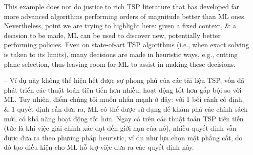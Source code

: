 \documentclass{article}
\begin{document}
\begin{itemize}
\begin{itemize}
\begin{itemize}
            This example does not do justice to rich TSP literature that has developed far more advanced algorithms performing orders of magnitude better than ML ones. Nevertheless, point we are trying to highlight here: given a fixed context, \& a decision to be made, ML can be used to discover new, potentially better performing policies. Even on state-of-art TSP algorithms (i.e., when exact solving is taken to its limits), many decisions are made in heuristic ways, e.g., cutting plane selection, thus leaving room for ML to assist in making these decisions.

            -- Ví dụ này không thể hiện hết được sự phong phú của các tài liệu TSP, vốn đã phát triển các thuật toán tiên tiến hơn nhiều, hoạt động tốt hơn gấp bội so với ML. Tuy nhiên, điểm chúng tôi muốn nhấn mạnh ở đây: với 1 bối cảnh cố định, \& 1 quyết định cần đưa ra, ML có thể được sử dụng để khám phá các chính sách mới, có khả năng hoạt động tốt hơn. Ngay cả trên các thuật toán TSP tiên tiến (tức là khi việc giải chính xác đạt đến giới hạn của nó), nhiều quyết định vẫn được đưa ra theo phương pháp heuristic, ví dụ như lựa chọn mặt phẳng cắt, do đó tạo điều kiện cho ML hỗ trợ việc đưa ra các quyết định này.


\end{itemize}
\end{itemize}
\end{itemize}
\end{document}
